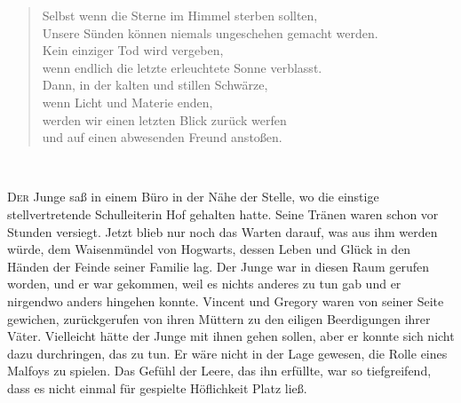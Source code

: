 \begin{chapterOpeningAuthorNote}
\begin{verse}
Selbst wenn die Sterne im Himmel sterben sollten, \\
Unsere Sünden können niemals ungeschehen gemacht werden. \\
Kein einziger Tod wird vergeben, \\
wenn endlich die letzte erleuchtete Sonne verblasst. \\
Dann, in der kalten und stillen Schwärze, \\
wenn Licht und Materie enden, \\
werden wir einen letzten Blick zurück werfen \\
und auf einen abwesenden Freund anstoßen.
\end{verse}
~
\end{chapterOpeningAuthorNote}

\lettrine{D}{er} Junge saß in einem Büro in der Nähe der Stelle, wo die einstige stellvertretende Schulleiterin Hof gehalten hatte. Seine Tränen waren schon vor Stunden versiegt. Jetzt blieb nur noch das Warten darauf, was aus ihm werden würde, dem Waisenmündel von Hogwarts, dessen Leben und Glück in den Händen der Feinde seiner Familie lag. Der Junge war in diesen Raum gerufen worden, und er war gekommen, weil es nichts anderes zu tun gab und er nirgendwo anders hingehen konnte. Vincent und Gregory waren von seiner Seite gewichen, zurückgerufen von ihren Müttern zu den eiligen Beerdigungen ihrer Väter. Vielleicht hätte der Junge mit ihnen gehen sollen, aber er konnte sich nicht dazu durchringen, das zu tun. Er wäre nicht in der Lage gewesen, die Rolle eines Malfoys zu spielen. Das Gefühl der Leere, das ihn erfüllte, war so tiefgreifend, dass es nicht einmal für gespielte Höflichkeit Platz ließ.


